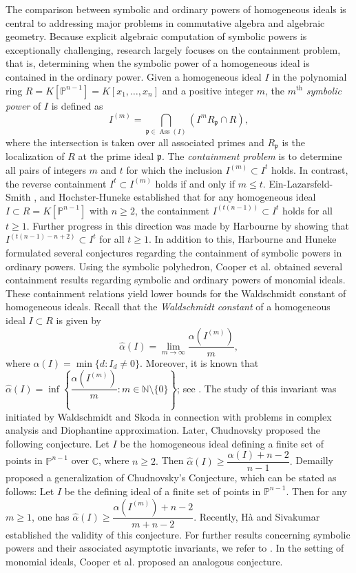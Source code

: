 \documentclass[12pt,reqno]{amsart}
\theoremstyle{definition}
\DeclareMathOperator{\Ass}{Ass}
\newcommand{\p}{\mathfrak{p}}
\newcommand{\ww}{\widehat{\alpha}}
\numberwithin{equation}{section}
\begin{document}
The comparison between symbolic and ordinary powers of homogeneous ideals is central to addressing major problems in commutative algebra and algebraic geometry. Because explicit algebraic computation of symbolic powers is exceptionally challenging, research largely focuses on the containment problem, that is, determining when the symbolic power of a homogeneous ideal is contained in the ordinary power. Given a homogeneous ideal $I$ in the polynomial ring $R = K[\mathbb{P}^{n - 1}] = K[x_1, \ldots, x_n]$ and a positive integer $m$, the $m^{\text{th}}$ \textit{symbolic power} of $I$ is defined as
\[I^{(m)} = \bigcap\limits_{\p \in \Ass(I)} \left( I^m R_{\p} \cap R \right),\] where the intersection is taken over all associated primes and $R_{\p}$ is the localization of $R$ at the prime ideal $\p.$ The \textit{containment problem} is to determine all pairs of integers $m$ and $t$ for which the inclusion $I^{(m)} \subset I^t$ holds. In contrast, the reverse containment $I^t \subset I^{(m)}$  holds if and only if $m \le t.$ Ein-Lazarsfeld-Smith \cite{ELS}, and Hochster-Huneke \cite{HH} established that for any homogeneous ideal $I \subset R = K[\mathbb{P}^{n - 1}]$ with $n \ge 2$, the containment $I^{(t(n - 1))} \subset I^t$ holds for all $t \ge 1.$ Further progress in this direction was made by Harbourne by showing that  $I^{(t(n - 1) - n + 2)} \subset I^t$ for all $t \ge 1.$ In addition to this, Harbourne and Huneke \cite{HarbourneHuneke} formulated several conjectures regarding the containment of symbolic powers in ordinary powers. Using the symbolic polyhedron, Cooper et al. \cite{CEHH} obtained several containment results regarding symbolic and ordinary powers of monomial ideals. These containment relations yield lower bounds for the Waldschmidt constant of homogeneous ideals. Recall that the \textit{Waldschmidt constant} of a homogeneous ideal $I \subset R$ is given by
\[\widehat{\alpha}(I) = \lim_{m \to \infty} \frac{\alpha(I^{(m)})}{m},\]
where $\alpha(I) = \min\{d : I_d \ne 0\}.$ Moreover, it is known that $\widehat{\alpha}(I) = \inf\left\{\dfrac{\alpha(I^{(m)})}{m} : m \in \mathbb{N} \setminus \{0\} \right\}$; see \cite[Lemma 2.3.1]{BocciBrian}. The study of this invariant was initiated by Waldschmidt and Skoda \cite{Skoda, Waldschmidt} in connection with problems in complex analysis and Diophantine approximation. Later, Chudnovsky \cite{Chudnovsky1} proposed the following conjecture. Let $I$ be the homogeneous ideal defining a finite set of points in $\mathbb{P}^{n - 1}$ over $\mathbb{C}$, where $n \ge 2.$ Then $\ww(I) \ge \dfrac{\alpha(I) + n - 2}{n - 1}.$ Demailly \cite{Demailly} proposed a generalization of Chudnovsky’s Conjecture, which can be stated as follows: Let $I$ be the defining ideal of a finite set of points in $\mathbb{P}^{n - 1}.$ Then for any $m \ge 1$, one has $\ww(I) \ge \dfrac{\alpha(I^{(m)}) + n - 2}{m + n - 2}.$ Recently, H\`a and Sivakumar \cite{Hasiva} established the validity of this conjecture. For further results concerning symbolic powers and their associated asymptotic invariants, we refer to \cite{BTSHB,BGEH,Bisui2,BN,Bocci, EH79,FLPX, Malara,Nagata2, Zar49}. In the setting of monomial ideals, Cooper et al. \cite{CEHH} proposed an analogous conjecture. 
\end{document}
